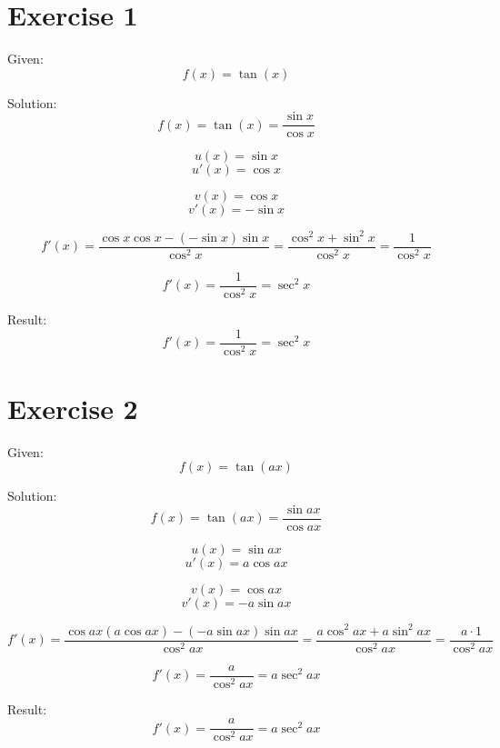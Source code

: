 \documentclass[a4paper, 10pt]{scrartcl}
\begin{document}
\section{Exercise 1}

Given:
\[f(x) = \tan(x)\]

Solution:
\[f(x) = \tan(x) = \frac{\sin{x}}{\cos{x}}\]

\[u(x) = \sin{x}\]
\[u'(x) = \cos{x}\]

\[v(x) = \cos{x}\]
\[v'(x) = -\sin{x}\]

\[f'(x) = \frac{\cos{x}\cos{x} - (-\sin{x})\sin{x}}{\cos^{2}{x}} =
         \frac{\cos^{2}{x} + \sin^{2}{x}}{\cos^{2}{x}} = \frac{1}{\cos^{2}{x}}\]

\[f'(x) = \frac{1}{\cos^{2}{x}} = \sec^{2}{x}\]


Result:
\[f'(x) = \frac{1}{\cos^{2}{x}} = \sec^{2}{x}\]

\section{Exercise 2}

Given:
\[f(x) = \tan(ax)\]

Solution:
\[f(x) = \tan(ax) = \frac{\sin{ax}}{\cos{ax}}\]

\[u(x) = \sin{ax}\]
\[u'(x) = a\cos{ax}\]

\[v(x) = \cos{ax}\]
\[v'(x) = -a\sin{ax}\]

\[f'(x) = \frac{\cos{ax}(a\cos{ax}) - (-a\sin{ax})\sin{ax}}{\cos^{2}{ax}} =
         \frac{a\cos^{2}{ax} + a\sin^{2}{ax}}{\cos^{2}{ax}} = \frac{a\cdot 1}{\cos^{2}{ax}}\]

\[f'(x) = \frac{a}{\cos^{2}{ax}} = a\sec^{2}{ax}\]


Result:
\[f'(x) = \frac{a}{\cos^{2}{ax}} = a\sec^{2}{ax}\]
\end{document}
